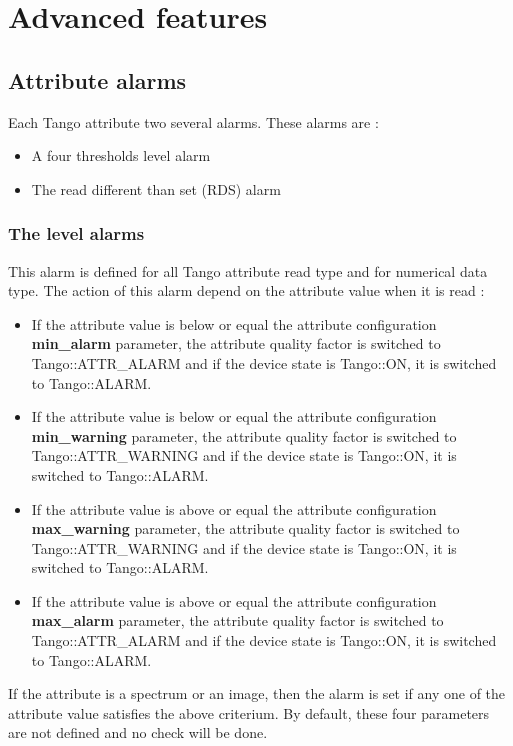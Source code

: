 
\chapter{Advanced features}


\section{Attribute alarms}

Each Tango attribute two several alarms. These alarms are :
\begin{itemize}
\item A four thresholds level alarm
\item The read different than set (RDS) alarm
\end{itemize}

\subsection{The level alarms}

This alarm is defined for all Tango attribute read type and for numerical
data type. The action of this alarm depend on the attribute value
when it is read :
\begin{itemize}
\item If the attribute value is below or equal the attribute configuration
\textbf{min\_alarm} parameter, the attribute quality
factor is switched to Tango::ATTR\_ALARM and if
the device state is Tango::ON, it is switched to Tango::ALARM. 
\item If the attribute value is below or equal the attribute configuration
\textbf{min\_warning} parameter, the attribute
quality factor is switched to Tango::ATTR\_WARNING
and if the device state is Tango::ON, it is switched to Tango::ALARM.
\item If the attribute value is above or equal the attribute configuration
\textbf{max\_warning} parameter, the attribute
quality factor is switched to Tango::ATTR\_WARNING
and if the device state is Tango::ON, it is switched to Tango::ALARM.
\item If the attribute value is above or equal the attribute configuration
\textbf{max\_alarm} parameter, the attribute quality
factor is switched to Tango::ATTR\_ALARM and if
the device state is Tango::ON, it is switched to Tango::ALARM.
\end{itemize}
If the attribute is a spectrum or an image, then the alarm is set
if any one of the attribute value satisfies the above criterium. By
default, these four parameters are not defined and no check will be
done.

